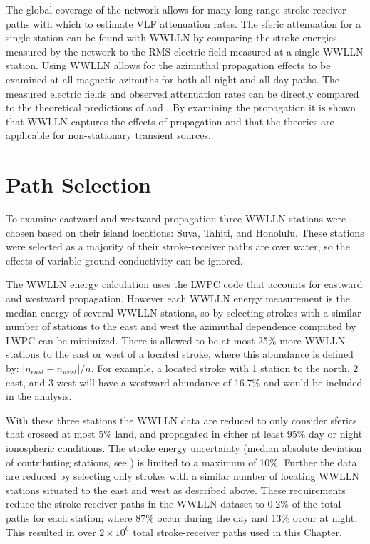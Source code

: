 The global coverage of the network allows for many long range stroke-receiver paths with which to estimate VLF attenuation rates.
The sferic attenuation for a single station can be found with WWLLN by comparing the stroke energies measured by the network to the RMS electric field measured at a single WWLLN station.
Using WWLLN allows for the azimuthal propagation effects to be examined at all magnetic azimuths for both all-night and all-day paths.
The measured electric fields and observed attenuation rates can be directly compared to the theoretical predictions of \citet{Wait1960a} and \citet{Taylor1960a}.
By examining the propagation it is shown that WWLLN captures the effects of propagation and that the theories are applicable for non-stationary transient sources.

\section{Path Selection}

To examine eastward and westward propagation three WWLLN stations were chosen based on their island locations: Suva, Tahiti, and Honolulu.
These stations were selected as a majority of their stroke-receiver paths are over water, so the effects of variable ground conductivity can be ignored. 

The WWLLN energy calculation uses the LWPC code that accounts for eastward and westward propagation.
However each WWLLN energy measurement is the median energy of several WWLLN stations, so by selecting strokes with a similar number of stations to the east and west the azimuthal dependence computed by LWPC can be minimized.
There is allowed to be at most 25\% more WWLLN stations to the east or west of a located stroke, where this abundance is defined by: $|n_{east} - n_{west}| / n$.
For example, a located stroke with 1 station to the north, 2 east, and 3 west will have a westward abundance of 16.7\% and would be included in the analysis.

With these three stations the WWLLN data are reduced to only consider sferics that crossed at most 5\% land, and propagated in either at least 95\% day or night ionospheric conditions.
The stroke energy uncertainty (median absolute deviation of contributing stations, see \citet{Hutchins2012}) is limited to a maximum of 10\%.
Further the data are reduced by selecting only strokes with a similar number of locating WWLLN stations situated to the east and west as described above.
These requirements reduce the stroke-receiver paths in the WWLLN dataset to 0.2\% of the total paths for each station; where 87\% occur during the day and 13\% occur at night.
This resulted in over $2\times10^6$ total stroke-receiver paths used in this Chapter.

